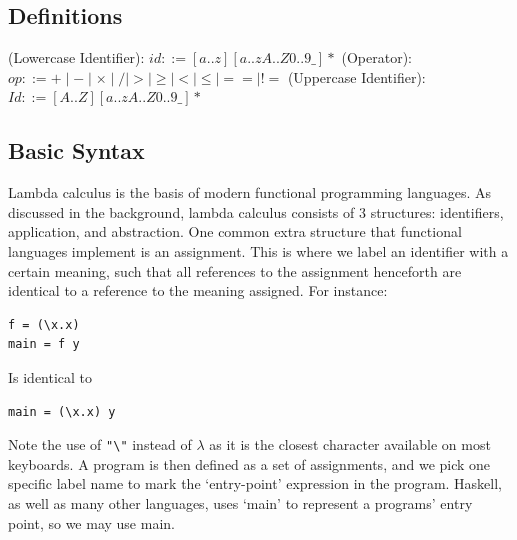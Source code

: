 \subsection{Definitions}

\begin{syntax}
\label{def:identifier_syntax}
(Lowercase Identifier): \(id ::= [a..z][a..zA..Z0..9\_]*\)\newline
(Operator): \(op ::= + \mid - \mid \times \mid / \mid > \mid \ge \mid < \mid \le \mid== \mid \mathrel{\mathtt{!=}} \)\newline
(Uppercase Identifier): \(Id ::= [A..Z][a..zA..Z0..9\_]*\)
\end{syntax}

\subsection{Basic Syntax}
Lambda calculus is the basis of modern functional programming languages. As discussed in the background, lambda calculus consists of 3 structures: identifiers, application, and abstraction.  One common extra structure that functional languages implement is an assignment. This is where we label an identifier with a certain meaning, such that all references to the assignment henceforth are identical to a reference to the meaning assigned. For instance:
\begin{lstlisting}[language=SFL]
f = (\x.x)
main = f y
\end{lstlisting}
Is identical to 
\begin{lstlisting}[language=SFL]
main = (\x.x) y
\end{lstlisting}
Note the use of \verb|"\"| instead of \(\lambda\) as it is the closest character available on most keyboards. A program is then defined as a set of assignments, and we pick one specific label name to mark the `entry-point' expression in the program. Haskell, as well as many other languages, uses `main' to represent a programs' entry point, so we may use main. 

